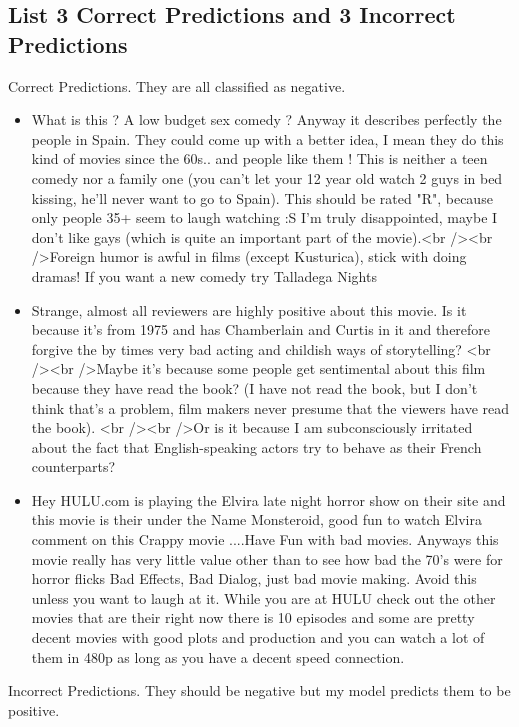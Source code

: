 \documentclass[10pt,a4paper]{article}
\begin{document}
\subsection{List 3 Correct Predictions and 3 Incorrect Predictions}
Correct Predictions. They are all classified as negative.
\begin{itemize}
\item What is this ? A low budget sex comedy ? Anyway it describes perfectly the people in Spain. They could come up with a better idea, I mean they do this kind of movies since the 60s.. and people like them ! This is neither a teen comedy nor a family one (you can't let your 12 year old watch 2 guys in bed kissing, he'll never want to go to Spain). This should be rated "R", because only people 35+ seem to laugh watching :S I'm truly disappointed, maybe I don't like gays (which is quite an important part of the movie).<br /><br />Foreign humor is awful in films (except Kusturica), stick with doing dramas! If you want a new comedy try Talladega Nights
\item Strange, almost all reviewers are highly positive about this movie. Is it because it's from 1975 and has Chamberlain and Curtis in it and therefore forgive the by times very bad acting and childish ways of storytelling? <br /><br />Maybe it's because some people get sentimental about this film because they have read the book? (I have not read the book, but I don't think that's a problem, film makers never presume that the viewers have read the book). <br /><br />Or is it because I am subconsciously irritated about the fact that English-speaking actors try to behave as their French counterparts?
\item Hey HULU.com is playing the Elvira late night horror show on their site and this movie is their under the Name Monsteroid, good fun to watch Elvira comment on this Crappy movie ....Have Fun with bad movies. Anyways this movie really has very little value other than to see how bad the 70's were for horror flicks Bad Effects, Bad Dialog, just bad movie making. Avoid this unless you want to laugh at it. While you are at HULU check out the other movies that are their right now there is 10 episodes and some are pretty decent movies with good plots and production and you can watch a lot of them in 480p as long as you have a decent speed connection.
\end{itemize}
Incorrect Predictions. They should be negative but my model predicts them to be positive.
\end{document}
